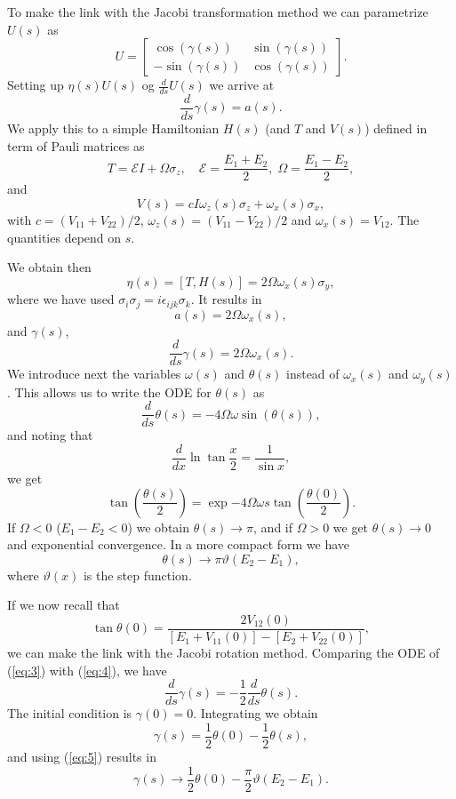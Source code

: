 To make the link with the Jacobi transformation method
we can parametrize $U(s)$ as
\[ 
U = \begin{bmatrix} \cos(\gamma(s)) & \sin(\gamma(s)) \\ -\sin(\gamma(s)) & \cos(\gamma(s)) \end{bmatrix}. 
\]
Setting up $\eta(s)U(s)$ og $\frac{d}{ds} U(s)$ we arrive at 
\[ 
\frac{d}{ds} \gamma(s) = a(s). 
\]
We apply this to a simple Hamiltonian $H(s)$ (and $T$ and $V(s)$)  defined in term of Pauli matrices  as
\[ 
T = \mathcal{E} I + \Omega \sigma_z, \quad \mathcal{E} = \frac{E_1+ E_2}{2}, \; \Omega = \frac{E_1-E_2}{2}, 
\]
and
\[ 
V(s) = c I \omega_z(s)\sigma_z + \omega_x(s)\sigma_x, 
\]
with $c = (V_{11}+V_{22})/2$, $\omega_z(s) = (V_{11}-V_{22})/2$ and $\omega_x(s) = V_12$. The quantities depend on
$s$. 

We obtain then
\[ \eta(s) = [T, H(s)] = 2\Omega\omega_x(s)\sigma_y, \]
where we have used $\sigma_i\sigma_j = i\epsilon_{ijk}\sigma_k$.
It results in
\[ a(s) = 2\Omega \omega_x(s), \]
and $\gamma(s)$,
\begin{equation} \frac{d}{ds} \gamma(s) = 2\Omega\omega_x(s). \label{eq:3}\end{equation}
We introduce next the  variables $\omega(s)$ and $\theta(s)$ instead of
$\omega_x(s)$ and $\omega_y(s)$. This allows us to write the ODE 
for $\theta(s)$ as
\begin{equation} 
\frac{d}{ds} \theta(s) = -4\Omega\omega \sin(\theta(s)), \label{eq:4}
\end{equation}
and noting that
\[ 
\frac{d}{dx} \ln \tan \frac{x}{2} = \frac{1}{\sin x}, 
\]
we get
\[ 
\tan\left(\frac{\theta(s)}{2}\right) = \exp{-4\Omega\omega s} \tan\left(
  \frac{\theta(0)}{2}\right). 
\]
If $\Omega<0$ ($E_1-E_2<0$) we obtain  $\theta(s)\rightarrow \pi$, and if 
$\Omega>0$ we get  $\theta(s)\rightarrow 0$ and exponential convergence. In a more 
compact form we have
\begin{equation} \theta(s) \rightarrow \pi \vartheta(E_2 - E_1),
  \label{eq:5} \end{equation}
where $\vartheta(x)$ is the  step function.

If we now recall that 
\[ \tan \theta(0) = \frac{2 V_{12}(0) }{[E_1 + V_{11}(0)]- [E_2 +
  V_{22}(0)]},
\]
we can make the link with the Jacobi rotation method. Comparing the  ODE of (\ref{eq:3}) with 
(\ref{eq:4}), we have
\[ \frac{d}{ds} \gamma(s) = -\frac{1}{2} \frac{d}{ds} \theta(s). \]
The initial condition is 
$\gamma(0) = 0$. Integrating we obtain 
\[ \gamma(s) = \frac{1}{2}\theta(0) - \frac{1}{2}\theta(s), \]
and using (\ref{eq:5}) results in 
\[ \gamma(s) \rightarrow \frac{1}{2}\theta(0) -
\frac{\pi}{2}\vartheta(E_2-E_1). \]

